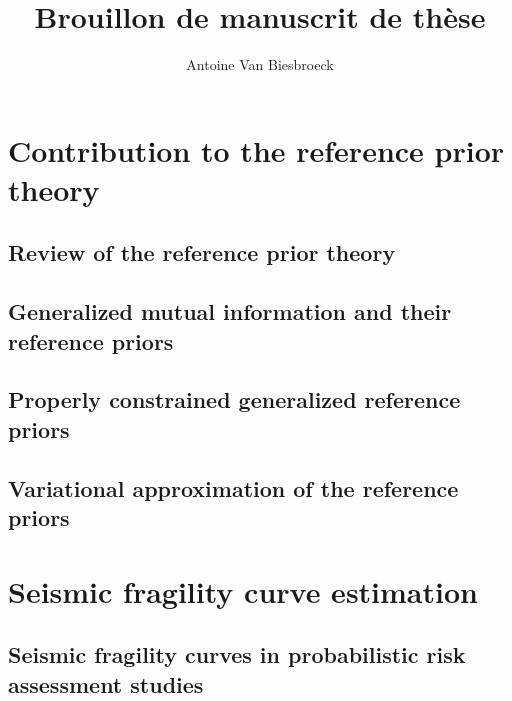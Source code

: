 \documentclass[a4paper]{book}
\title{Brouillon de manuscrit de thèse}
\author{Antoine Van Biesbroeck}
\begin{document}
\maketitle

\tableofcontents








\part{Contribution to the reference prior theory}


\chapter{Review of the reference prior theory}




\chapter{Generalized mutual information and their reference priors}




\chapter{Properly constrained generalized reference priors}




\chapter{Variational approximation of the reference priors}




\part{Seismic fragility curve estimation}


\chapter{Seismic fragility curves in probabilistic risk assessment studies}
\end{document}

